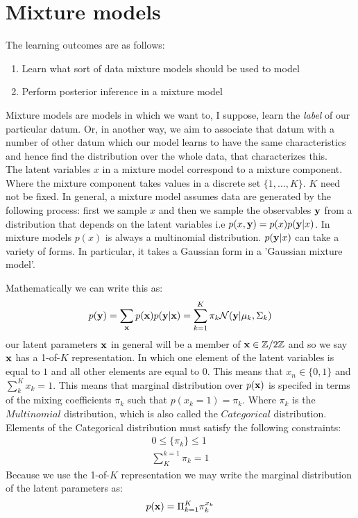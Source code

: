 
\section{Mixture models}
\label{sec:mixofgauss}
The learning outcomes are as follows:
\begin{enumerate}
	\item Learn what sort of data mixture models should be used to model
	\item Perform posterior inference in a mixture model
\end{enumerate}

Mixture models are models in which we want to, I suppose, learn the \textit{label} of our particular datum. Or, in another way, we aim to associate that datum with a number of other datum which our model learns to have the same characteristics and hence find the distribution over the whole data, that characterizes this. \\

The latent variables $x$ in a mixture model correspond to a mixture component. Where the mixture component takes values in a discrete set $\{1, \ldots, K\}$. $K$ need not be fixed. 
In general, a mixture model assumes data are generated by the following process: first we sample $x$ and then we sample the observables $\textbf{y}$ from a distribution that depends on the latent variables i.e $p(x,\textbf{y}) = p(x)p(\textbf{y}|x)$. In mixture models $p(x)$ is always a multinomial distribution. $p(\textbf{y}|x)$ can take a variety of forms. In particular, it takes a Gaussian form in a 'Gaussian mixture model'. 

Mathematically we can write this as:
\begin{equation} p(\textbf{y}) = \sum_{\textbf{x}}p(\textbf{x})p(\textbf{y}|\textbf{x}) = \sum_{k=1}^{K} \pi_{k} \mathcal{N}(\textbf{y} | \mu_{k},\Sigma_{k})\end{equation}
our latent parameters $\textbf{x}$ in general will be a member of  $\textbf{x} \in \mathbb{Z} / 2\mathbb{Z}$ and so we say $\textbf{x}$ has a 1-of-$K$ representation. In which one element of the latent variables is equal to $1$ and all other elements are equal to $0$. This means that $x_{n} \in \{0,1\}$ and $\sum_{k}^{K} x_{k} = 1$.  This means that marginal distribution over $p(\textbf{x})$ is specifed in terms of the mixing coefficients $\pi_{k}$ such that $p(x_{k} = 1) = \pi_{k}$. Where $\pi_{k}$ is the $Multinomial$ distribution, which is also called the $Categorical$ distribution. Elements of the Categorical distribution must satisfy the following constraints: \begin{align}
0 \leq \{\pi_{k}\} \leq 1 \\
\sum_{K}^{k=1}\pi_{k} = 1
\end{align}
Because we use the 1-of-$K$ representation we may write the marginal distribution of the latent parameters as:
\begin{equation}
	p(\textbf{x}) = \Pi_{k=1}^{K} \pi_{k}^{x_{k}}
\end{equation}

